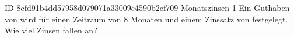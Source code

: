 \begin{exercise}
      {ID-8cfd91b4dd57958d079071a33009c4590b2cf709}
      {Monatszinsen 1}
  \ifproblem\problem
    Ein Guthaben von  wird für einen Zeitraum von \num{8} Monaten
    und einem Zinssatz von  festgelegt. Wie viel Zinsen fallen an?
  \fi
\end{exercise}
